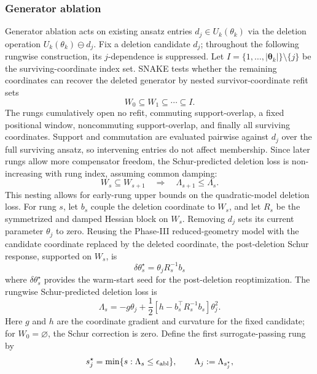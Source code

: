 \documentclass[
  reprint,
  amsmath,
  amssymb,
  aps,
  pra,
  nofootinbib,
  superscriptaddress,
  floatfix
]{revtex4-2}
\begin{document}
\subsubsection{Generator ablation}
Generator ablation acts on existing ansatz entries $d_j\in U_k(\theta_k)$ via the deletion operation \(U_k(\theta_k)\ominus d_j\). Fix a deletion candidate \(d_j\); throughout the following rungwise construction, its \(j\)-dependence is suppressed. Let \(I=\{1,\ldots,|\boldsymbol{\theta}_k|\}\setminus\{j\}\) be the surviving-coordinate index set. SNAKE tests whether the remaining coordinates can recover the deleted generator by nested survivor-coordinate refit sets
\[
W_0\subseteq W_1\subseteq\cdots\subseteq I .
\]
The rungs cumulatively open no refit, commuting support-overlap, a fixed positional window, noncommuting support-overlap, and finally all surviving coordinates. Support and commutation are evaluated pairwise against \(d_j\) over the full surviving ansatz, so intervening entries do not affect membership. Since later rungs allow more compensator freedom, the Schur-predicted deletion loss is non-increasing with rung index, assuming common damping:
\begin{equation}
W_s\subseteq W_{s+1}
\quad\Longrightarrow\quad
\Lambda_{s+1}\le \Lambda_s .
\end{equation}
This nesting allows for early-rung upper bounds on the quadratic-model deletion loss. For rung $s$, let \(b_s\) couple the deletion coordinate to \(W_s\), and let \(R_s\) be the symmetrized and damped Hessian block on \(W_s\). Removing \(d_j\) sets its current parameter \(\theta_j\) to zero. Reusing the Phase-III reduced-geometry model with the candidate coordinate replaced by the deleted coordinate, the post-deletion Schur response, supported on \(W_s\), is
\begin{equation}
\delta\theta_s^\star
=
\theta_j R_s^{-1}b_s
\label{eq:ablation_schur_response}
\end{equation}
where $\delta\theta_s^\star$ provides the warm-start seed for the post-deletion reoptimization. The rungwise Schur-predicted deletion loss is
\begin{equation}
\Lambda_s
=
-g\theta_j
+\frac12
\left[
h
-b_s^{\top}R_s^{-1}b_s
\right]\theta_j^2 .
\label{eq:ablation_schur_loss}
\end{equation}
Here \(g\) and \(h\) are the coordinate gradient and curvature for the fixed candidate; for \(W_0=\varnothing\), the Schur correction is zero. Define the first surrogate-passing rung by
\begin{equation}
s_j^\star
=
\min\{s:\Lambda_s\le\epsilon_{\rm abl}\},
\qquad
\Lambda_j:=\Lambda_{s_j^\star},
\label{eq:ablation_first_passing_rung}
\end{equation}
\end{document}
